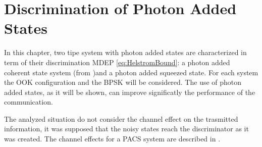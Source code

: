 
\chapter{Discrimination of Photon Added States}
    In this chapter, two tipe system with photon added states are characterized in term of
    their discrimination MDEP \ref{eq:HelstromBound}: a photon added coherent state system 
    (from \cite{PACSDisc})and a photon added squeezed state. For each system the OOK
    configuration and the BPSK will be considered. 
    The use of photon added states, as it will be shown, can improve significatly the performance
    of the communication. 
    
    The analyzed situation do not consider the channel effect on the trasmitted information, it was
    supposed that the noisy states reach the discriminator as it was created. The channel effects
    for a PACS system are described in \cite{PACSDisc}.

    